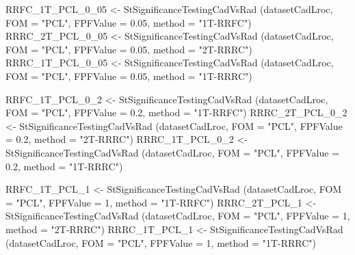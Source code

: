 \documentclass[
]{book}
\newenvironment{Shaded}{\begin{snugshade}}{\end{snugshade}}
\newcommand{\AttributeTok}[1]{\textcolor[rgb]{0.77,0.63,0.00}{#1}}
\newcommand{\DecValTok}[1]{\textcolor[rgb]{0.00,0.00,0.81}{#1}}
\newcommand{\FloatTok}[1]{\textcolor[rgb]{0.00,0.00,0.81}{#1}}
\newcommand{\FunctionTok}[1]{\textcolor[rgb]{0.00,0.00,0.00}{#1}}
\newcommand{\NormalTok}[1]{#1}
\newcommand{\OtherTok}[1]{\textcolor[rgb]{0.56,0.35,0.01}{#1}}
\newcommand{\StringTok}[1]{\textcolor[rgb]{0.31,0.60,0.02}{#1}}
\begin{document}
\begin{Shaded}
\begin{Highlighting}[]


\NormalTok{RRFC\_1T\_PCL\_0\_05 }\OtherTok{\textless{}{-}} \FunctionTok{StSignificanceTestingCadVsRad}\NormalTok{ (datasetCadLroc, }
\AttributeTok{FOM =} \StringTok{"PCL"}\NormalTok{, }\AttributeTok{FPFValue =} \FloatTok{0.05}\NormalTok{, }\AttributeTok{method =} \StringTok{"1T{-}RRFC"}\NormalTok{)}
\NormalTok{RRRC\_2T\_PCL\_0\_05 }\OtherTok{\textless{}{-}} \FunctionTok{StSignificanceTestingCadVsRad}\NormalTok{ (datasetCadLroc, }
\AttributeTok{FOM =} \StringTok{"PCL"}\NormalTok{, }\AttributeTok{FPFValue =} \FloatTok{0.05}\NormalTok{, }\AttributeTok{method =} \StringTok{"2T{-}RRRC"}\NormalTok{)}
\NormalTok{RRRC\_1T\_PCL\_0\_05 }\OtherTok{\textless{}{-}} \FunctionTok{StSignificanceTestingCadVsRad}\NormalTok{ (datasetCadLroc, }
\AttributeTok{FOM =} \StringTok{"PCL"}\NormalTok{, }\AttributeTok{FPFValue =} \FloatTok{0.05}\NormalTok{, }\AttributeTok{method =} \StringTok{"1T{-}RRRC"}\NormalTok{)}

\NormalTok{RRFC\_1T\_PCL\_0\_2 }\OtherTok{\textless{}{-}} \FunctionTok{StSignificanceTestingCadVsRad}\NormalTok{ (datasetCadLroc, }
\AttributeTok{FOM =} \StringTok{"PCL"}\NormalTok{, }\AttributeTok{FPFValue =} \FloatTok{0.2}\NormalTok{, }\AttributeTok{method =} \StringTok{"1T{-}RRFC"}\NormalTok{)}
\NormalTok{RRRC\_2T\_PCL\_0\_2 }\OtherTok{\textless{}{-}} \FunctionTok{StSignificanceTestingCadVsRad}\NormalTok{ (datasetCadLroc, }
\AttributeTok{FOM =} \StringTok{"PCL"}\NormalTok{, }\AttributeTok{FPFValue =} \FloatTok{0.2}\NormalTok{, }\AttributeTok{method =} \StringTok{"2T{-}RRRC"}\NormalTok{)}
\NormalTok{RRRC\_1T\_PCL\_0\_2 }\OtherTok{\textless{}{-}} \FunctionTok{StSignificanceTestingCadVsRad}\NormalTok{ (datasetCadLroc, }
\AttributeTok{FOM =} \StringTok{"PCL"}\NormalTok{, }\AttributeTok{FPFValue =} \FloatTok{0.2}\NormalTok{, }\AttributeTok{method =} \StringTok{"1T{-}RRRC"}\NormalTok{)}

\NormalTok{RRFC\_1T\_PCL\_1 }\OtherTok{\textless{}{-}} \FunctionTok{StSignificanceTestingCadVsRad}\NormalTok{ (datasetCadLroc, }
\AttributeTok{FOM =} \StringTok{"PCL"}\NormalTok{, }\AttributeTok{FPFValue =} \DecValTok{1}\NormalTok{, }\AttributeTok{method =} \StringTok{"1T{-}RRFC"}\NormalTok{)}
\NormalTok{RRRC\_2T\_PCL\_1 }\OtherTok{\textless{}{-}} \FunctionTok{StSignificanceTestingCadVsRad}\NormalTok{ (datasetCadLroc, }
\AttributeTok{FOM =} \StringTok{"PCL"}\NormalTok{, }\AttributeTok{FPFValue =} \DecValTok{1}\NormalTok{, }\AttributeTok{method =} \StringTok{"2T{-}RRRC"}\NormalTok{)}
\NormalTok{RRRC\_1T\_PCL\_1 }\OtherTok{\textless{}{-}} \FunctionTok{StSignificanceTestingCadVsRad}\NormalTok{ (datasetCadLroc, }
\AttributeTok{FOM =} \StringTok{"PCL"}\NormalTok{, }\AttributeTok{FPFValue =} \DecValTok{1}\NormalTok{, }\AttributeTok{method =} \StringTok{"1T{-}RRRC"}\NormalTok{)}


\end{Highlighting}
\end{Shaded}
\end{document}
